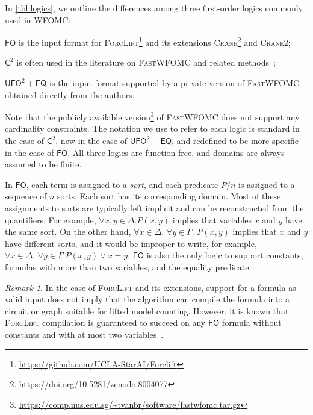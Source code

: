 \documentclass{article}
\theoremstyle{remark}
\newtheorem*{remark}{Remark}
\newcommand{\Ctwo}{$\mathsf{C}^{2}$}
\newcommand{\FO}{$\mathsf{FO}$}
\newcommand{\UFO}{$\mathsf{UFO}^{2} + \mathsf{EQ}$}
\newcommand{\Cranetwo}{\textsc{Crane2}}
\begin{document}
In \cref{tbl:logics}, we outline the differences among three first-order logics
commonly used in WFOMC:
\begin{enumerate*}[label=(\roman*)]
  \item \FO{} is the input format for
  \textsc{ForcLift}\footnote{\url{https://github.com/UCLA-StarAI/Forclift}} and
  its extensions
  \textsc{Crane}\footnote{\url{https://doi.org/10.5281/zenodo.8004077}} and
  \Cranetwo{};
  \item \Ctwo{} is often used in the literature on \textsc{FastWFOMC} and
  related
  methods~\cite{DBLP:journals/jair/Kuzelka21,DBLP:conf/aaai/MalhotraS22};
  \item \UFO{} is the input format supported by a private version of
  \textsc{FastWFOMC} obtained directly from the authors.
\end{enumerate*}
Note that the publicly available
version\footnote{\url{https://comp.nus.edu.sg/~tvanbr/software/fastwfomc.tar.gz}}
of \textsc{FastWFOMC} does not support any cardinality constraints. The notation
we use to refer to each logic is standard in the case of \Ctwo{}, new in the
case of \UFO{}, and redefined to be more specific in the case of \FO{}. All
three logics are function-free, and domains are always assumed to be finite.

In \FO{}, each term is assigned to a \emph{sort}, and each predicate $P/n$ is
assigned to a sequence of $n$ sorts. Each sort has its corresponding domain.
Most of these assignments to sorts are typically left implicit and can be
reconstructed from the quantifiers. For example, $\forall x,y \in \Delta\text{.
}P(x, y)$ implies that variables $x$ and $y$ have the same sort. On the other
hand, $\forall x \in \Delta\text{. }\forall y \in \Gamma\text{. } P(x, y)$
implies that $x$ and $y$ have different sorts, and it would be improper to
write, for example, $\forall x \in \Delta\text{. }\forall y \in \Gamma\text{.
} P(x, y) \lor x = y$. \FO{} is also the only logic to support constants,
formulas with more than two variables, and the equality predicate.

\begin{remark}
  In the case of \textsc{ForcLift} and its extensions, support for a formula as
  valid input does not imply that the algorithm can compile the formula into a
  circuit or graph suitable for lifted model counting. However, it is known that
  \textsc{ForcLift} compilation is guaranteed to succeed on any \FO{} formula
  without constants and with at most two
  variables~\cite{DBLP:conf/nips/Broeck11,DBLP:conf/kr/BroeckMD14}.
\end{remark}
\end{document}

